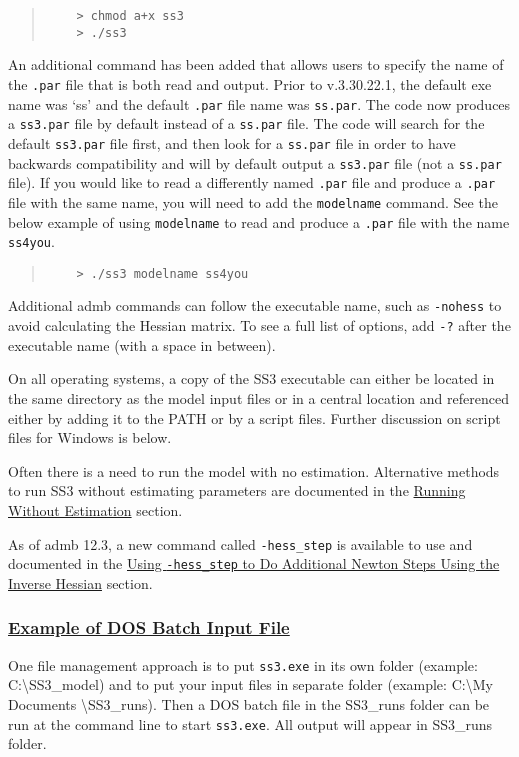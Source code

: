 \begin{quote}
	\begin{verbatim}
	> chmod a+x ss3
	> ./ss3
	\end{verbatim}
\end{quote}

An additional command has been added that allows users to specify the name of the \texttt{.par} file that is both read and output. Prior to v.3.30.22.1, the default exe name was `ss' and the default \texttt{.par} file name was \texttt{ss.par}. The code now produces a \texttt{ss3.par} file by default instead of a \texttt{ss.par} file. The code will search for the default \texttt{ss3.par} file first, and then look for a \texttt{ss.par} file in order to have backwards compatibility and will by default output a \texttt{ss3.par} file (not a \texttt{ss.par} file). If you would like to read a differently named \texttt{.par} file and produce a \texttt{.par} file with the same name, you will need to add the \texttt{modelname} command. See the below example of using \texttt{modelname} to read and produce a \texttt{.par} file with the name \texttt{ss4you}.

\begin{quote}
	\begin{verbatim}
	> ./ss3 modelname ss4you
	\end{verbatim}
\end{quote}

Additional \gls{admb} commands can follow the executable name, such as \texttt{-nohess} to avoid calculating the Hessian matrix. To see a full list of options, add \texttt{-?} after the executable name (with a space in between).

On all operating systems, a copy of the SS3 executable can either be located in the same directory as the model input files or in a central location and referenced either by adding it to the PATH or by a script files. Further discussion on script files for Windows is below.

Often there is a need to run the model with no estimation. Alternative methods to run SS3 without estimating parameters are documented in the \hyperlink{NoEst}{Running Without Estimation} section. 

As of \gls{admb} 12.3, a new command called \texttt{-hess\_step} is available to use and documented in the \hyperlink{hess-step}{Using \texttt{-hess\_step} to Do Additional Newton Steps Using the Inverse Hessian} section.

\hypertarget{DOS}{}
\subsubsection[Example of DOS Batch Input File]{\protect\hyperlink{DOS}{Example of DOS Batch Input File}}
One file management approach is to put \texttt{ss3.exe} in its own folder (example:  C:\textbackslash SS3\_model) and to put your input files in separate folder (example:  C:\textbackslash My Documents \textbackslash SS3\_runs). Then a DOS batch file in the SS3\_runs folder can be run at the command line to start \texttt{ss3.exe}. All output will appear in SS3\_runs folder.

